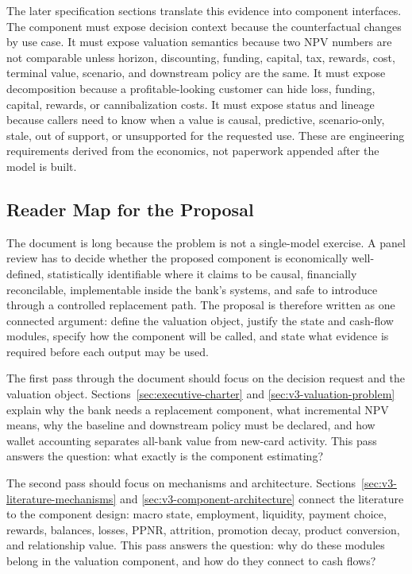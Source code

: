 \documentclass[11pt]{article}
\newcommand{\1}{\mathbf{1}}
\begin{document}
The later specification sections translate this evidence into component
interfaces. The component must expose decision context because the
counterfactual changes by use case. It must expose valuation semantics because
two NPV numbers are not comparable unless horizon, discounting, funding,
capital, tax, rewards, cost, terminal value, scenario, and downstream policy are
the same. It must expose decomposition because a profitable-looking customer
can hide loss, funding, capital, rewards, or cannibalization costs. It must
expose status and lineage because callers need to know when a value is causal,
predictive, scenario-only, stale, out of support, or unsupported for the
requested use. These are engineering requirements derived from the economics,
not paperwork appended after the model is built.

\subsection{Reader Map for the Proposal}
\label{sec:how-to-read}

The document is long because the problem is not a single-model exercise. A
panel review has to decide whether the proposed component is economically
well-defined, statistically identifiable where it claims to be causal,
financially reconcilable, implementable inside the bank's systems, and safe to
introduce through a controlled replacement path. The proposal is therefore
written as one connected argument: define the valuation object, justify the
state and cash-flow modules, specify how the component will be called, and state
what evidence is required before each output may be used.

The first pass through the document should focus on the decision request and
the valuation object. Sections~\ref{sec:executive-charter} and
\ref{sec:v3-valuation-problem} explain why the bank needs a replacement
component, what incremental NPV means, why the baseline and downstream policy
must be declared, and how wallet accounting separates all-bank value from
new-card activity. This pass answers the question: what exactly is the
component estimating?

The second pass should focus on mechanisms and architecture.
Sections~\ref{sec:v3-literature-mechanisms} and
\ref{sec:v3-component-architecture} connect the literature to the component
design: macro state, employment, liquidity, payment choice, rewards, balances,
losses, PPNR, attrition, promotion decay, product conversion, and relationship
value. This pass answers the question: why do these modules belong in the
valuation component, and how do they connect to cash flows?
\end{document}

